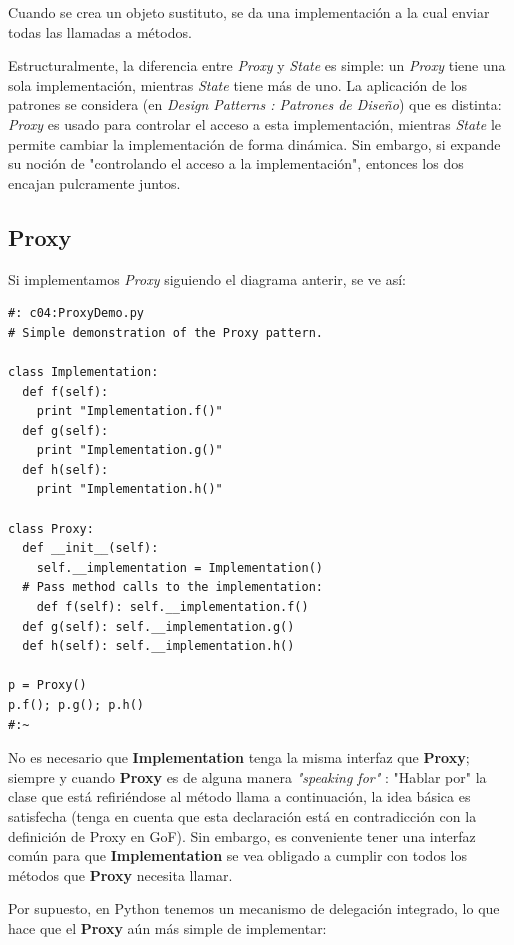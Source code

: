 \documentclass{article}
\begin{document}
Cuando se crea un objeto sustituto, se da una implementación a la cual enviar todas las llamadas a métodos.    \newline

Estructuralmente, la diferencia entre \textit{Proxy} y \textit{State} es simple: un \textit{Proxy} tiene una sola implementación, mientras \textit{State} tiene más de uno. La aplicación  de los patrones se considera (en \textit{Design Patterns : Patrones de Diseño}) que es distinta: \textit{Proxy} es usado para controlar el acceso a esta implementación, mientras \textit{State}  le permite cambiar la implementación de forma dinámica. Sin embargo, si expande su noción de "controlando el acceso a la implementación", entonces los dos encajan pulcramente juntos.

\subsection{Proxy}

Si implementamos \textit{Proxy} siguiendo el diagrama anterir, se ve así:

 \begin{lstlisting} 
#: c04:ProxyDemo.py 
# Simple demonstration of the Proxy pattern. 

class Implementation: 
  def f(self):  
    print "Implementation.f()" 
  def g(self):  
    print "Implementation.g()"  
  def h(self):  
    print "Implementation.h()" 
    
class Proxy: 
  def __init__(self):  
    self.__implementation = Implementation()  
  # Pass method calls to the implementation: 
    def f(self): self.__implementation.f()  
  def g(self): self.__implementation.g()  
  def h(self): self.__implementation.h()  
  
p = Proxy() 
p.f(); p.g(); p.h() 
#:~ 
 \end{lstlisting}
 
No es necesario que \textbf{Implementation} tenga la misma interfaz que \textbf{Proxy}; siempre y cuando \textbf{Proxy} es de alguna manera \textit{ "speaking for"} : "Hablar por" la clase que está refiriéndose al método llama a continuación, la idea básica es satisfecha (tenga en cuenta que esta declaración está en contradicción con la definición de Proxy en GoF). Sin embargo, es conveniente tener una interfaz común para que \textbf{Implementation} se vea obligado a cumplir con todos los métodos que \textbf{Proxy} necesita llamar. \newline
	
Por supuesto, en Python tenemos un mecanismo de delegación integrado, lo que hace que el \textbf{Proxy} aún más simple de implementar:   \newline
\end{document}
